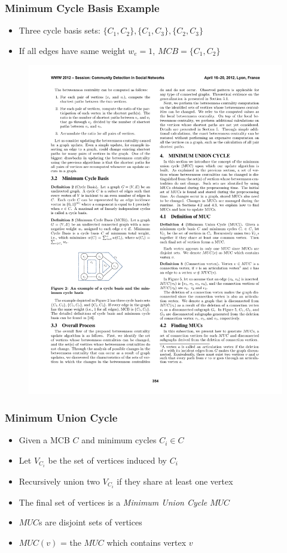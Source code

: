 \begin{frame}
  \frametitle{Minimum Cycle Basis Example}
  \begin{itemize}
    \item Three cycle basis sets: $\{C_1, C_2\} , \{C_1, C_3\} , \{C_2, C_3\}$
    \item If all edges have same weight $w_e = 1$, $MCB = \{C_1, C_2\}$
  \end{itemize}
  \begin{figure}[H]
    \centering
    \includegraphics[scale=2]{imgs/qube-mcb}
  \end{figure}
\end{frame}


\begin{frame}
  \frametitle{Minimum Union Cycle}
  
  \begin{itemize}
    \item Given a MCB $C$ and minimum cycles $C_i \in C$
    \item Let $V_{C_i}$ be the set of vertices induced by $C_i$
    \item Recursively union two $V_{C_i}$ if they share at least one vertex
    \item The final set of vertices is a \emph{Minimum Union Cycle} $MUC$
  \end{itemize}
  
  \begin{itemize}
    \item $MUC$s are disjoint sets of vertices
    \item $MUC(v)$ = the $MUC$ which contains vertex $v$
  \end{itemize}
\end{frame}


